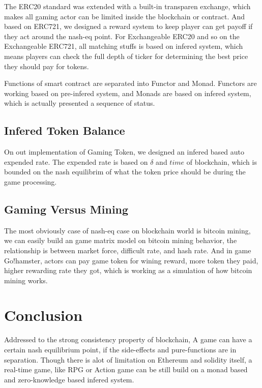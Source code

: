 \documentclass[twocolumn]{article}
\begin{document}
The ERC20 standard was extended with a built-in transparen exchange, which makes all gaming actor can be limited inside the blockchain or contract. And based on ERC721, we designed a reward system to keep player can get payoff if they act around the nash-eq point. For Exchangeable ERC20 and so on the Exchangeable ERC721, all matching stuffs is based on infered system, which means players can check the full depth of ticker for determining the best price they should pay for tokens.

Functions of smart contract are separated into Functor and Monad. Functors are working based on pre-infered system, and Monads are based on infered system, which is actually presented a sequence of status.

\subsection {Infered Token Balance}

On out implementation of Gaming Token, we designed an infered based auto expended rate. The expended rate is based on $\delta$ and $time$ of blockchain, which is bounded on the nash equilibrim of what the token price should be during the game processing.

\subsection {Gaming Versus Mining}

The most obviously case of nash-eq case on blockchain world is bitcoin mining\cite{bitcoin}, we can easily build an game matrix model on bitcoin mining behavior, the relationship is between market force, difficult rate, and hash rate. And in game Go!hamster, actors can pay game token for wining reward, more token they paid, higher rewarding rate they got, which is working as a simulation of how bitcoin mining works.

\section {Conclusion}

Addressed to the strong consistency property of blockchain, A game can have a certain nash equilibrium point, if the side-effects and pure-functions are in separation. Though there is alot of limitation on Ethereum and solidity itself, a real-time game, like RPG or Action game can be still build on a monad based and zero-knowledge based infered system.



\end{document}
